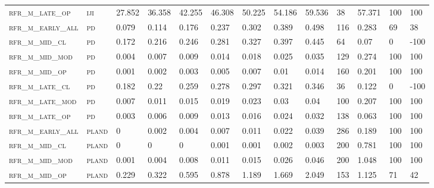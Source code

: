 \begin{landscape}
\begin{center}
\begin{footnotesize}
\begin{longtable}{lllllllllllll}
\textsc{rfr\_m\_late\_op  } & \textsc{iji       }   & 27.852  & 36.358  & 42.255   & 46.308   & 50.225   & 54.186   & 59.536   & 38     & 57.371        & 100           & 100      \\
\textsc{rfr\_m\_early\_all} & \textsc{pd        }   & 0.079   & 0.114   & 0.176    & 0.237    & 0.302    & 0.389    & 0.498    & 116    & 0.283         & 69            & 38       \\
\textsc{rfr\_m\_mid\_cl   } & \textsc{pd        }   & 0.172   & 0.216   & 0.246    & 0.281    & 0.327    & 0.397    & 0.445    & 64     & 0.07          & 0             & -100     \\
\textsc{rfr\_m\_mid\_mod  } & \textsc{pd        }   & 0.004   & 0.007   & 0.009    & 0.014    & 0.018    & 0.025    & 0.035    & 129    & 0.274         & 100           & 100      \\
\textsc{rfr\_m\_mid\_op   } & \textsc{pd        }   & 0.001   & 0.002   & 0.003    & 0.005    & 0.007    & 0.01     & 0.014    & 160    & 0.201         & 100           & 100      \\
\textsc{rfr\_m\_late\_cl  } & \textsc{pd        }   & 0.182   & 0.22    & 0.259    & 0.278    & 0.297    & 0.321    & 0.346    & 36     & 0.122         & 0             & -100     \\
\textsc{rfr\_m\_late\_mod } & \textsc{pd        }   & 0.007   & 0.011   & 0.015    & 0.019    & 0.023    & 0.03     & 0.04     & 100    & 0.207         & 100           & 100      \\
\textsc{rfr\_m\_late\_op  } & \textsc{pd        }   & 0.003   & 0.006   & 0.009    & 0.013    & 0.016    & 0.024    & 0.032    & 138    & 0.063         & 100           & 100      \\
\textsc{rfr\_m\_early\_all} & \textsc{pland     }   & 0       & 0.002   & 0.004    & 0.007    & 0.011    & 0.022    & 0.039    & 286    & 0.189         & 100           & 100      \\
\textsc{rfr\_m\_mid\_cl   } & \textsc{pland     }   & 0       & 0       & 0        & 0.001    & 0.001    & 0.002    & 0.003    & 200    & 0.781         & 100           & 100      \\
\textsc{rfr\_m\_mid\_mod  } & \textsc{pland     }   & 0.001   & 0.004   & 0.008    & 0.011    & 0.015    & 0.026    & 0.046    & 200    & 1.048         & 100           & 100      \\
\textsc{rfr\_m\_mid\_op   } & \textsc{pland     }   & 0.229   & 0.322   & 0.595    & 0.878    & 1.189    & 1.669    & 2.049    & 153    & 1.125         & 71            & 42       \\

\end{longtable}
\end{footnotesize}
\end{center}
\end{landscape}
